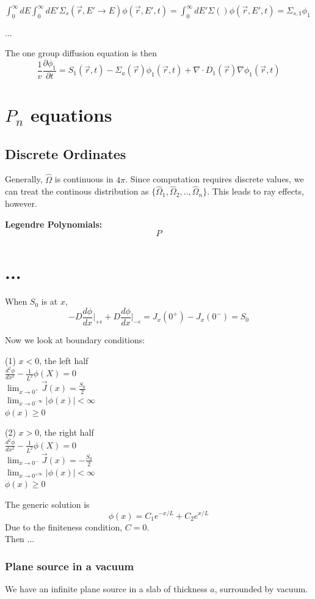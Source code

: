 \documentclass{report}
\newcommand{\tab}{\-\hspace{1cm}}
\newcommand{\h}[1]{\section*{#1}}
\newcommand{\hh}[1]{\subsection*{#1}}
\newcommand{\hhh}[1]{\subsubsection*{#1}}
\newcommand{\p}{\partial}
\newcommand{\Xs}{\Sigma}
\newcommand{\Oov}{\frac{1}{v}}
\newcommand{\pos}{\vec{r}}
\newcommand{\cur}{\vec{J}}
\newcommand{\Oh}{\hat{\Omega}}
\newcommand{\intzi}{\int_0^{\infty}}
\newcommand{\rt}{(\pos,t)}
\newcommand{\rEtprime}{(\pos,E',t)}
\begin{document}
$\intzi dE \intzi dE' \Xs_s(\pos,E' \rightarrow E)\phi\rEtprime = \intzi dE' \Xs()\phi\rEtprime = \Xs_{s,1}\phi_1$

$...$

The one group diffusion equation is then
$$ \Oov \frac{\p \phi_1}{\p t} = S_1\rt - \Xs_a(\pos)\phi_1\rt + \nabla \cdot D_1(\pos) \nabla \phi_1\rt $$



\h{$P_n$ equations}

\hh{Discrete Ordinates}

Generally, $\Oh$ is continuous in $4\pi$. Since computation requires discrete values, we can treat the continous distribution as $\{\Oh_1, \Oh_2, .. , \Oh_n\}$. This leads to ray effects, however.

\textbf{Legendre Polynomials: } 
$$ P $$

\h{...}

When $S_0$ is at $x$,
$$-D\frac{d\phi}{dx}\bigg|_{+\epsilon} + D\frac{d\phi}{dx}\bigg|_{-\epsilon} = J_x(0^+) - J_x(0^-) = S_0$$

Now we look at boundary conditions:
\begin{multicols}{2}
(1) $x<0$, the left half\\
	\tab $\frac{d^2\phi}{dx^2} - \frac{1}{L^2}\phi(X) = 0$\\
	\tab $\lim_{x\rightarrow0^+}\cur(x) = \frac{S_0}{2}$\\
	
	\tab $\lim_{x\rightarrow0^{-\infty}}|\phi(x)| < \infty$\\
	\tab $\phi(x) \geq 0$
	
(2) $x>0$, the right half\\
	\tab $\frac{d^2\phi}{dx^2} - \frac{1}{L^2}\phi(X) = 0$\\
	\tab $\lim_{x\rightarrow0^-}\cur(x) = -\frac{S_0}{2}$\\
	
	\tab $\lim_{x\rightarrow0^{+\infty}}|\phi(x)| < \infty$\\
	\tab $\phi(x) \geq 0$
\end{multicols}

The generic solution is \\
$$ \phi(x) = C_1e^{-x/L} + C_2e^{x/L} $$
Due to the finiteness condition, $C=0$.\\
Then ...

\hhh{Plane source in a vacuum}

We have an infinite plane source in a slab of thickness $a$, surrounded by vacuum.
\end{document}
